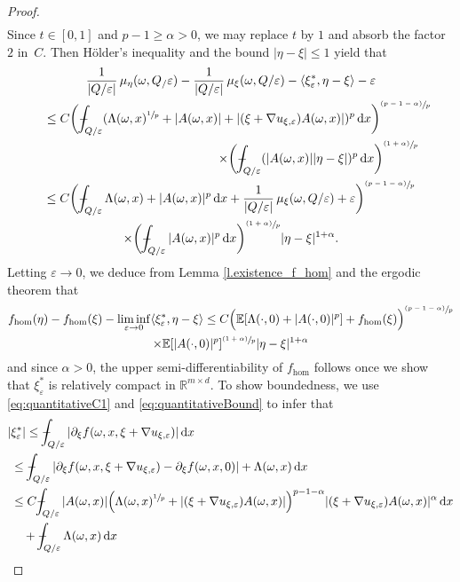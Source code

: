 \documentclass[10pt]{amsart}
\newcommand{\psfrac}[2]{\sfrac{(#1)}{#2}}
\theoremstyle{definition}
\def\Xint#1{\mathchoice
{\XXint\displaystyle\textstyle{#1}}%
{\XXint\textstyle\scriptstyle{#1}}%
{\XXint\scriptstyle\scriptscriptstyle{#1}}%
{\XXint\scriptscriptstyle\scriptscriptstyle{#1}}%
\!\int}
\def\XXint#1#2#3{{\setbox0=\hbox{$#1{#2#3}{\int}$ }
\vcenter{\hbox{$#2#3$ }}\kern-.57\wd0}}
\def\dashint{\Xint-}
\let\e\varepsilon
\let\w\omega
\newcommand{\dx}{\,\mathrm{d}x}
\newcommand{\R}{\mathbb{R}}
\begin{document}
\begin{proof}
\begin{multline*}
\end{multline*}
Since $t\in [0,1]$ and $p-1\geq\alpha>0$, we may replace $t$ by $1$ and absorb the factor~$2$ in~$C$. Then Hölder's inequality and the bound $|\eta-\xi|\leq 1$ yield that\vspace*{-5pt}
\begin{multline*}
\frac{1}{|Q/\e|}\,\mu_{\eta}(\w,Q_/\e)-\frac{1}{|Q/\e|}\,\mu_{\xi}(\w,Q/\e)-\langle\xi_{\e}^*,\eta-\xi\rangle-\e
\\
\hspace*{4.5mm}\leq C\biggl(\dashint_{Q/\e}(\Lambda(\w,x)^{\sfrac{1}{p}}+|A(\w,x)|+|(\xi+\nabla u_{\xi,\e})A(\w,x)|)^{p}\dx\biggr)^{\psfrac{p-1-\alpha}{p}}
\\
\shoveright{\times \biggl(\dashint_{Q/\e}(|A(\w,x)||\eta-\xi|)^p\dx\biggr)^{\psfrac{1+\alpha}{p}}}
\\
\leq C\biggl(\dashint_{Q/\e}\Lambda(\w,x)+|A(\w,x)|^p\dx+\frac{1}{|Q/\e|}\,\mu_{\xi}(\w,Q/\e)+\e\biggr)^{\psfrac{p-1-\alpha}{p}}
\\
\times\biggl(\dashint_{Q/\e}|A(\w,x)|^p\dx\biggr)^{\psfrac{1+\alpha}{p}}|\eta-\xi|^{1+\alpha}.
\end{multline*}
Letting $\e\to 0$, we deduce from Lemma \ref{l.existence_f_hom} and the ergodic theorem that\vspace*{-5pt}
\begin{multline*}
f_{\hom}(\eta)-f_{\hom}(\xi)-\liminf_{\e\to 0}\langle\xi_{\e}^*,\eta-\xi\rangle\leq C\Big(\mathbb{E}[\Lambda(\cdot,0)+|A(\cdot,0)|^p]+f_{\hom}(\xi)\Big)^{\psfrac{p-1-\alpha}{p}}
\\
\times\mathbb{E}[|A(\cdot,0)|^p]^{\psfrac{1+\alpha}{p}}|\eta-\xi|^{1+\alpha}
\end{multline*}
and since $\alpha>0$, the upper semi-differentiability of $f_{\hom}$ follows once we show that $\xi_{\e}^*$ is relatively compact in $\R^{m\times d}$. To show boundedness, we use \eqref{eq:quantitativeC1} and \eqref{eq:quantitativeBound} to infer that\vspace*{-5pt}
\begin{align*}
|&\xi_{\e}^*|\leq\dashint_{Q/\e}|\partial_{\xi}f(\w,x,\xi+\nabla u_{\xi,\e})|\dx
\\
&\leq \dashint_{Q/\e}|\partial_{\xi}f(\w,x,\xi+\nabla u_{\xi,\e})-\partial_{\xi}f(\w,x,0)|+\Lambda(\w,x)\dx
\\
&\leq C\dashint_{Q/\e}|A(\w,x)|\Big(\Lambda(\w,x)^{\sfrac{1}{p}}+|(\xi+\nabla u_{\xi,\e})A(\w,x)|\Big)^{p-1-\alpha}|(\xi+\nabla u_{\xi,\e})A(\w,x)|^{\alpha}\dx
\\
&\quad+\dashint_{Q/\e}\Lambda(\w,x)\dx

\end{align*}
\end{proof}
\end{document}
